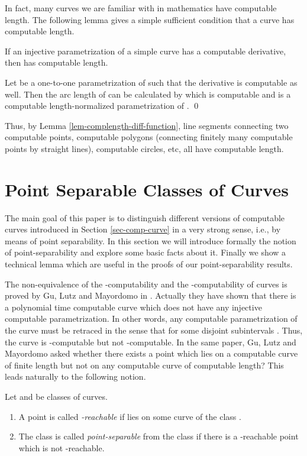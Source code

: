 \documentclass{LMCS}
\theoremstyle{plain}
\begin{document}
In fact, many curves we are familiar with in mathematics have computable length. The following lemma gives a simple sufficient condition that a curve has computable length.

\begin{lem}\label{lem-complength-diff-function}
If an injective parametrization of a simple curve  has a computable derivative, then  has computable length.
\end{lem}
\proof Let  be a one-to-one parametrization of  such that the derivative  is computable as well. Then the arc length of  can be calculated by  which is computable and   is a computable length-normalized parametrization of .
\qed

Thus, by Lemma \ref{lem-complength-diff-function},  line segments connecting two computable points, computable polygons (connecting finitely many computable points by straight lines), computable circles, etc, all have computable length.




\section{Point Separable Classes of Curves}\label{sec-point-separable}

The main goal of this paper is to distinguish different versions of computable curves introduced in Section \ref{sec-comp-curve} in a very strong sense, i.e., by means of point separability. In this section we will introduce formally the notion of point-separability and explore some basic facts about it. Finally we show a technical lemma which are useful in the proofs of our point-separability results.

The non-equivalence of the -computability and the -computability of curves is proved by Gu, Lutz and Mayordomo in \cite{GLM11}. Actually they have shown that there is a polynomial time computable curve   which does not have any injective computable parametrization. In other words, any computable parametrization  of the curve  must be retraced in the sense that  for some disjoint subintervals . Thus, the curve  is -computable but not -computable. In the same paper, Gu, Lutz and Mayordomo asked  whether  there exists a point which lies on a computable curve of finite length but not on any computable curve of computable length?  This leads naturally to the following notion.

\begin{defi}\label{def-point-sep}
Let  and  be classes of curves.
\begin{enumerate}[(1)]
    \item A point  is called  {\em -reachable} if  lies on some curve  of the class .
    \item The class  is called {\em point-separable} from the class  if there is a -reachable point which is not -reachable.
\end{enumerate}
\end{defi}
\end{document}

